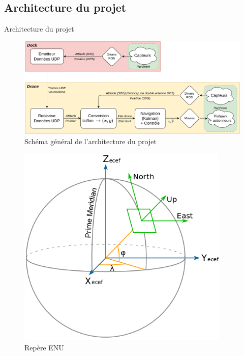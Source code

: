 \documentclass[pdftex,beamer,aspectratio=169]{beamer}
\theoremstyle{definition}
\theoremstyle{example}
\theoremstyle{plain}
\begin{document}
\subsection{Architecture du projet}

\begin{frame}[fragile]{Architecture du projet}
  \centering
  \begin{minipage}{0.69\textwidth}
    \begin{figure}
      \centering
      \includegraphics[width=\textwidth]{schema_general.png}
      \caption{Schéma général de l'architecture du projet}
    \end{figure}
  \end{minipage}\hfill
  \begin{minipage}{0.3\textwidth}
    \begin{figure}
      \centering
      \includegraphics[width=0.9\textwidth]{ENU.png}
      \caption{Repère ENU}
    \end{figure}
  \end{minipage}
\end{frame}
\end{document}
